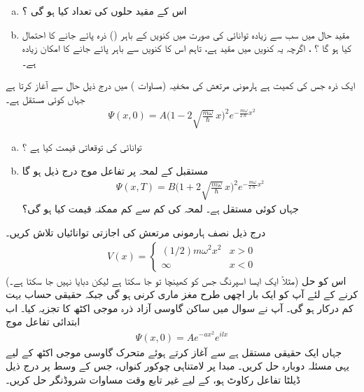 \begin{enumerate}[a.]
\item
 اس کے مقید حلوں کی تعداد کیا ہو گی ؟
\item 
 مقید حال میں سب سے زیادہ توانائی کی صورت میں کنویں  کے باہر () ذرہ پائے جانے کا احتمال کیا ہو گا ؟
 ، اگرچہ یہ کنویں  میں مقید ہے، تاہم اس کا کنویں  سے باہر پائے جانے کا امکان زیادہ ہے۔ 
\end{enumerate}
ایک ذرہ جس کی کمیت ہے ہارمونی مرتعش کی مخفیہ (مساوات ) میں درج ذیل حال سے آغاز کرتا ہے جہاں کوئی مستقل ہے۔
\begin{align*}
\Psi(x,0)=A\Big(1-2\sqrt{\frac{m\omega}{\hslash}}\, x \Big)^{2}e^{-\frac{m\omega}{2\hslash}x^{2}}
\end{align*}
%
\begin{enumerate}[a.]
\item
 توانائی کی توقعاتی قیمت کیا ہے ؟
\item
مستقبل کے لمحہ  پر تفاعل موج درج ذیل ہو گا
\begin{align*}
\Psi(x,T)=B\Big(1+2\sqrt{\frac{m\omega}{\hslash}}\,x \Big)^{2}e^{-\frac{m\omega}{2\hslash}x^{2}} 
\end{align*}
 جہاں  کوئی مستقل ہے۔ لمحہ  کی کم سے کم ممکنہ قیمت کیا ہو گی؟ 
\end{enumerate}
درج ذیل نصف ہارمونی مرتعش کی اجازتی توانائیاں تلاش کریں۔
\begin{align*}
V(x)=
\begin{cases}
(1/2)m\omega^{2}x^{2}&x> 0\\
\infty & x< 0
\end{cases}
 \end{align*}
(مثلاً ایک ایسا اسپرنگ جس کو کھینچا تو جا سکتا ہے لیکن دبایا نہیں جا سکتا ہے۔)  اس کو حل کرنے کے لئے آپ کو ایک بار اچھی طرح مغز ماری کرنی  ہو گی جبکہ حقیقی حساب بہت کم درکار ہو گی۔ 
آپ نے سوال  میں ساکن گاوسی آزاد ذرہ موجی اکٹھ کا تجزیہ کیا۔ اب ابتدائی تفاعل موج 
\begin{align*}
\Psi(x,0)=Ae^{-ax^{2}}e^{ilx} 
\end{align*} 
 جہاں ایک حقیقی مستقل ہے سے آغاز کرتے ہوئے متحرک گاوسی موجی اکٹھ کے لیے یہی مسئلہ دوبارہ حل کریں۔
مبدا پر لامتناہی چوکور کنواں، جس کے وسط پر درج ذیل ڈیلٹا تفاعل رکاوٹ ہو، کے لیے غیر تابع وقت مساوات شروڈنگر حل کریں۔
